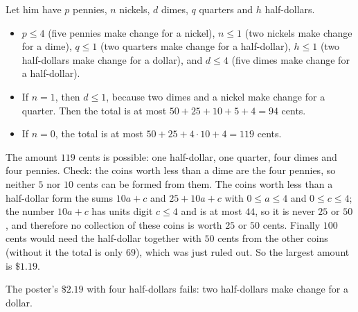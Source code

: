 Let him have $p$ pennies, $n$ nickels, $d$ dimes, $q$ quarters and $h$ half-dollars.
\begin{itemize}
\item $p\le4$ (five pennies make change for a nickel), $n\le1$ (two nickels make change for a dime), $q\le1$ (two quarters make change for a half-dollar), $h\le1$ (two half-dollars make change for a dollar), and $d\le4$ (five dimes make change for a half-dollar).
\item If $n=1$, then $d\le1$, because two dimes and a nickel make change for a quarter. Then the total is at most $50+25+10+5+4=94$ cents.
\item If $n=0$, the total is at most $50+25+4\cdot10+4=119$ cents.
\end{itemize}
The amount $119$ cents is possible: one half-dollar, one quarter, four dimes and four pennies. Check: the coins worth less than a dime are the four pennies, so neither $5$ nor $10$ cents can be formed from them. The coins worth less than a half-dollar form the sums $10a+c$ and $25+10a+c$ with $0\le a\le4$ and $0\le c\le4$; the number $10a+c$ has units digit $c\le4$ and is at most $44$, so it is never $25$ or $50$, and therefore no collection of these coins is worth $25$ or $50$ cents. Finally $100$ cents would need the half-dollar together with $50$ cents from the other coins (without it the total is only $69$), which was just ruled out. So the largest amount is $\boxed{\$1.19}$.

The poster's $\$2.19$ with four half-dollars fails: two half-dollars make change for a dollar.
